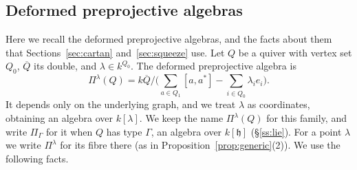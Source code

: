 \documentclass[11pt]{amsart}
\numberwithin{table}{section}
\numberwithin{figure}{section}
\numberwithin{equation}{section}
\theoremstyle{definition}
\theoremstyle{plain}
\newcommand{\h}{\mathfrak{h}}
\begin{document}
\subsection{Deformed preprojective algebras}\label{ss:dpa}

Here we recall the deformed preprojective algebras, and the facts about them that Sections~\ref{sec:cartan} and~\ref{sec:squeeze} use. Let $Q$ be a quiver with vertex set $Q_0$, $\overline{Q}$ its double, and $\lambda \in k^{Q_0}$. The deformed preprojective algebra \cite{CBH} is
\[
\Pi^\lambda(Q) = k\overline{Q} \Big/ \Big( \sum_{a \in Q_1} [a, a^*] - \sum_{i \in Q_0} \lambda_i e_i \Big).
\]
It depends only on the underlying graph, and we treat $\lambda$ as coordinates, obtaining an algebra over $k[\lambda]$. We keep the name $\Pi^\lambda(Q)$ for this family, and write $\Pi_\Gamma$ for it when $Q$ has type $\Gamma$, an algebra over $k[\h]$ (\S\ref{ss:lie}). For a point $\lambda$ we write $\Pi^\lambda$ for its fibre there (as in Proposition~\ref{prop:generic}(2)). We use the following facts.
\end{document}
